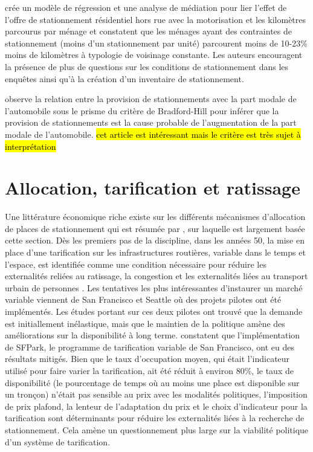 \textcite{Currans:HouseholdsConstrained:2023} crée un modèle de régression et une analyse de médiation pour lier l'effet de l'offre de stationnement résidentiel hors rue avec la motorisation et les kilomètres parcourus par ménage et constatent que les ménages ayant des contraintes de stationnement (moins d'un stationnement par unité) parcourent moins de 10-23\% moins de kilomètres à typologie de voisinage constante. Les auteurs encouragent la présence de plus de questions sur les conditions de stationnement dans les enquêtes ainsi qu'à la création d'un inventaire de stationnement. \par
\textcite{McCahill:EffectsParking:2016} observe la relation entre la provision de stationnements avec la part modale de l'automobile sous le prisme du critère de Bradford-Hill pour inférer que la provision de stationnements est la cause probable de l'augmentation de la part modale de l'automobile. \hl{cet article est intéressant mais le critère est très sujet à interprétation}

\section{Allocation, tarification et ratissage}

Une littérature économique riche existe sur les différents mécanismes d'allocation de places de stationnement qui est résumée par \textcite{Inci:ReviewEconomics:2015}, sur laquelle est largement basée cette section. Dès les premiers pas de la discipline, dans les années 50, la mise en place d'une tarification sur les infrastructures routières, variable dans le temps et l'espace, est identifiée comme une condition nécessaire pour réduire les externalités reliées au ratissage, la congestion et les externalités liées au transport urbain de personnes \parencite{Vickrey:StatementJoint:1994}. Les tentatives les plus intéressantes d'instaurer un marché variable viennent de San Francisco et Seattle où des projets pilotes ont été implémentés. Les études portant sur ces deux pilotes ont trouvé que la demande est initiallement inélastique, mais que le maintien de la politique amène des améliorations sur la disponibilité à long terme. \textcite{Chatman:TheoryImplementation:2014} constatent que l'implémentation de SFPark, le programme de tarification variable de San Francisco, ont eu des résultats mitigés. Bien que le taux d'occupation moyen, qui était l'indicateur utilisé pour faire varier la tarification,  ait été réduit à environ 80\%, le taux de disponibilité (le pourcentage de temps où au moins une place est disponible sur un tronçon) n'était pas sensible au prix avec les modalités politiques, l'imposition de prix plafond, la lenteur de l'adaptation du prix et le choix d'indicateur pour la tarification sont déterminants pour réduire les externalités liées à la recherche de stationnement. Cela amène un questionnement plus large sur la viabilité politique d'un système de tarification.\par

